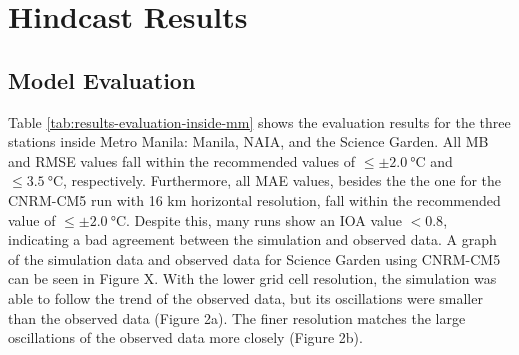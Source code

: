 \section{Hindcast Results}
	\subsection{Model Evaluation}
		Table \ref{tab:results-evaluation-inside-mm} shows the evaluation results for the three stations inside Metro Manila: Manila, NAIA, and the Science Garden. 
		All MB and RMSE values fall within the recommended values of $\leq \pm \qty{2.0}{\degreeCelsius}$ and $\leq \qty{3.5}{\degreeCelsius}$, respectively.
		Furthermore, all MAE values, besides the the one for the CNRM-CM5 run with 16 km horizontal resolution, fall within the recommended value of $\leq \pm \qty{2.0}{\degreeCelsius}$.
		Despite this, many runs show an IOA value $< 0.8$, indicating a bad agreement between the simulation and observed data.
		A graph of the simulation data and observed data for Science Garden using CNRM-CM5 can be seen in Figure X. 
		With the lower grid cell resolution, the simulation was able to follow the trend of the observed data, but its oscillations were smaller than the observed data (Figure 2a).
		The finer resolution matches the large oscillations of the observed data more closely (Figure 2b).
		
